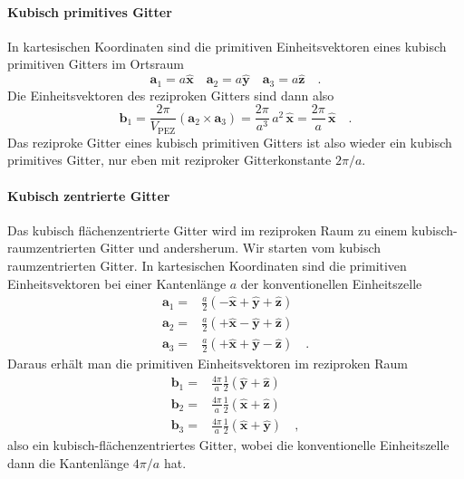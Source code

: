 \paragraph{Kubisch primitives Gitter} In kartesischen Koordinaten sind die primitiven Einheitsvektoren eines kubisch primitiven Gitters im Ortsraum
\begin{equation}
 \mathbf{a}_1 = a \hat{\mathbf{x}} \quad \mathbf{a}_2 = a \hat{\mathbf{y}}
 \quad \mathbf{a}_3 = a \hat{\mathbf{z}} \quad .
\end{equation}
Die Einheitsvektoren des reziproken Gitters sind dann also
\begin{equation}
  \mathbf{b}_1 = \frac{2 \pi}{V_\text{PEZ}} \left(  \mathbf{a}_2 \times \mathbf{a}_3 \right)  = \frac{2 \pi}{a^3} \, a^2  \, \hat{\mathbf{x}} = \frac{2 \pi}{a}  \, \hat{\mathbf{x}}  \quad .
\end{equation}
Das reziproke Gitter eines kubisch primitiven Gitters ist also wieder ein kubisch primitives Gitter, nur eben mit reziproker Gitterkonstante $2 \pi / a$.


\paragraph{Kubisch zentrierte  Gitter} Das kubisch flächenzentrierte Gitter wird im reziproken Raum zu einem kubisch-raumzentrierten Gitter und andersherum. Wir starten vom kubisch raumzentrierten Gitter. In kartesischen Koordinaten sind die primitiven Einheitsvektoren bei einer Kantenlänge $a$ der konventionellen Einheitszelle
\begin{align}
 \mathbf{a}_1 = & \frac{a}{2} \left( - \hat{\mathbf{x}} + \hat{\mathbf{y}} +\hat{\mathbf{z}} \right) \\
  \mathbf{a}_2 = & \frac{a}{2} \left( + \hat{\mathbf{x}} - \hat{\mathbf{y}} +\hat{\mathbf{z}} \right) \\
   \mathbf{a}_3 = & \frac{a}{2} \left( + \hat{\mathbf{x}} + \hat{\mathbf{y}} - \hat{\mathbf{z}} \right)  \quad .
\end{align}
Daraus erhält man die primitiven Einheitsvektoren im reziproken Raum
\begin{align}
\mathbf{b}_1 = & \frac{4\pi}{a} \frac{1}{2} \left( \hat{\mathbf{y}} + \hat{\mathbf{z}}  \right) \\
\mathbf{b}_2 = & \frac{4\pi}{a} \frac{1}{2} \left( \hat{\mathbf{x}} + \hat{\mathbf{z}}  \right) \\
\mathbf{b}_3 = & \frac{4\pi}{a} \frac{1}{2} \left( \hat{\mathbf{x}} + \hat{\mathbf{y}}  \right)  \quad ,
\end{align}
also ein kubisch-flächenzentriertes Gitter, wobei die konventionelle Einheitszelle dann die Kantenlänge $4 \pi / a$ hat.


